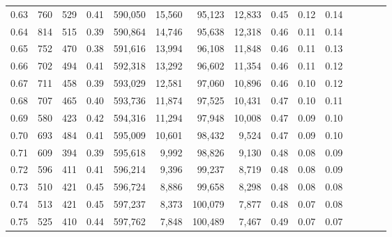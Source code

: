 \begin{tabular}{rrrcrrrrrrrrrrr}
0.63 &     760 &    529 &                                       0.41 &  590,050 &   15,560 &   95,123 &   12,833 &  0.45 &  0.12 &                         0.14 \\
0.64 &     814 &    515 &                                       0.39 &  590,864 &   14,746 &   95,638 &   12,318 &  0.46 &  0.11 &                         0.14 \\
0.65 &     752 &    470 &                                       0.38 &  591,616 &   13,994 &   96,108 &   11,848 &  0.46 &  0.11 &                         0.13 \\
0.66 &     702 &    494 &                                       0.41 &  592,318 &   13,292 &   96,602 &   11,354 &  0.46 &  0.11 &                         0.12 \\
0.67 &     711 &    458 &                                       0.39 &  593,029 &   12,581 &   97,060 &   10,896 &  0.46 &  0.10 &                         0.12 \\
0.68 &     707 &    465 &                                       0.40 &  593,736 &   11,874 &   97,525 &   10,431 &  0.47 &  0.10 &                         0.11 \\
0.69 &     580 &    423 &                                       0.42 &  594,316 &   11,294 &   97,948 &   10,008 &  0.47 &  0.09 &                         0.10 \\
0.70 &     693 &    484 &                                       0.41 &  595,009 &   10,601 &   98,432 &    9,524 &  0.47 &  0.09 &                         0.10 \\
0.71 &     609 &    394 &                                       0.39 &  595,618 &    9,992 &   98,826 &    9,130 &  0.48 &  0.08 &                         0.09 \\
0.72 &     596 &    411 &                                       0.41 &  596,214 &    9,396 &   99,237 &    8,719 &  0.48 &  0.08 &                         0.09 \\
0.73 &     510 &    421 &                                       0.45 &  596,724 &    8,886 &   99,658 &    8,298 &  0.48 &  0.08 &                         0.08 \\
0.74 &     513 &    421 &                                       0.45 &  597,237 &    8,373 &  100,079 &    7,877 &  0.48 &  0.07 &                         0.08 \\
0.75 &     525 &    410 &                                       0.44 &  597,762 &    7,848 &  100,489 &    7,467 &  0.49 &  0.07 &                         0.07 \\

\end{tabular}
